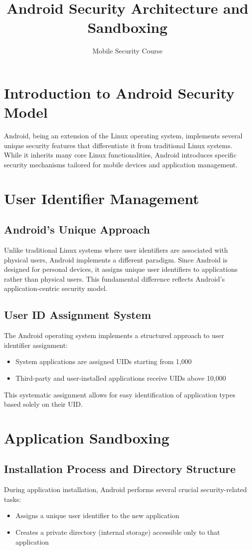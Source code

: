 \documentclass{article}
\title{Android Security Architecture and Sandboxing}
\author{Mobile Security Course}
\date{}
\begin{document}
\maketitle

\section{Introduction to Android Security Model}
Android, being an extension of the Linux operating system, implements several unique security features that differentiate it from traditional Linux systems. While it inherits many core Linux functionalities, Android introduces specific security mechanisms tailored for mobile devices and application management.

\section{User Identifier Management}
\subsection{Android's Unique Approach}
Unlike traditional Linux systems where user identifiers are associated with physical users, Android implements a different paradigm. Since Android is designed for personal devices, it assigns unique user identifiers to applications rather than physical users. This fundamental difference reflects Android's application-centric security model.

\subsection{User ID Assignment System}
The Android operating system implements a structured approach to user identifier assignment:
\begin{itemize}
    \item System applications are assigned UIDs starting from 1,000
    \item Third-party and user-installed applications receive UIDs above 10,000
\end{itemize}
This systematic assignment allows for easy identification of application types based solely on their UID.

\section{Application Sandboxing}
\subsection{Installation Process and Directory Structure}
During application installation, Android performs several crucial security-related tasks:
\begin{itemize}
    \item Assigns a unique user identifier to the new application
    \item Creates a private directory (internal storage) accessible only to that application
\end{itemize}
\end{document}
